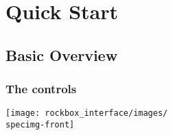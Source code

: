 \chapter{\label{ref:rockbox_interface}Quick Start}
\section{Basic Overview}
\subsection{The \daps{} controls}

\begin{center}
\texttt{[image: rockbox\_interface/images/\\specimg-front]}
\end{center}

